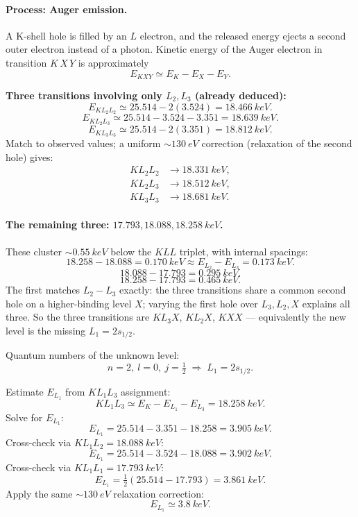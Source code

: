\documentclass[11pt]{article}
\begin{document}
\paragraph{Process: Auger emission.} A K-shell hole is filled by an $L$ electron, and the released energy ejects a second outer electron instead of a photon. Kinetic energy of the Auger electron in transition $K\,X\,Y$ is approximately
\[
E_{KXY}\simeq E_K-E_X-E_Y.
\]

\textbf{Three transitions involving only $L_2,L_3$ (already deduced):}
\[
E_{KL_2L_2}\simeq 25.514-2(3.524)=\SI{18.466}{keV}.
\]
\[
E_{KL_2L_3}\simeq 25.514-3.524-3.351=\SI{18.639}{keV}.
\]
\[
E_{KL_3L_3}\simeq 25.514-2(3.351)=\SI{18.812}{keV}.
\]
Match to observed values; a uniform $\sim\SI{130}{eV}$ correction (relaxation of the second hole) gives:
\[
\boxed{\;
\begin{aligned}
KL_2L_2 &\to \SI{18.331}{keV},\\
KL_2L_3 &\to \SI{18.512}{keV},\\
KL_3L_3 &\to \SI{18.681}{keV}.
\end{aligned}\;}
\]

\paragraph{The remaining three: $17.793, 18.088, 18.258\ \unit{keV}$.}

These cluster $\sim\SI{0.55}{keV}$ below the $KLL$ triplet, with internal spacings:
\[
18.258-18.088=\SI{0.170}{keV}\approx E_{L_2}-E_{L_3}=\SI{0.173}{keV}.
\]
\[
18.088-17.793=\SI{0.295}{keV}.
\]
\[
18.258-17.793=\SI{0.465}{keV}.
\]
The first matches $L_2\!-\!L_3$ exactly: the three transitions share a common second hole on a higher-binding level $X$; varying the first hole over $L_3,L_2,X$ explains all three. So the three transitions are $KL_3X$, $KL_2X$, $KXX$ --- equivalently the new level is the missing $L_1=2s_{1/2}$.

Quantum numbers of the unknown level:
\[
\boxed{\;n=2,\ l=0,\ j=\tfrac12\;\Rightarrow\;L_1=2s_{1/2}.\;}
\]

Estimate $E_{L_1}$ from $KL_1L_3$ assignment:
\[
KL_1L_3\simeq E_K-E_{L_1}-E_{L_3}=\SI{18.258}{keV}.
\]
Solve for $E_{L_1}$:
\[
E_{L_1}=25.514-3.351-18.258=\SI{3.905}{keV}.
\]
Cross-check via $KL_1L_2=\SI{18.088}{keV}$:
\[
E_{L_1}=25.514-3.524-18.088=\SI{3.902}{keV}.
\]
Cross-check via $KL_1L_1=\SI{17.793}{keV}$:
\[
E_{L_1}=\tfrac12(25.514-17.793)=\SI{3.861}{keV}.
\]
Apply the same $\sim\SI{130}{eV}$ relaxation correction:
\[
\boxed{\;E_{L_1}\simeq \SI{3.8}{keV}.\;}
\]
\end{document}
